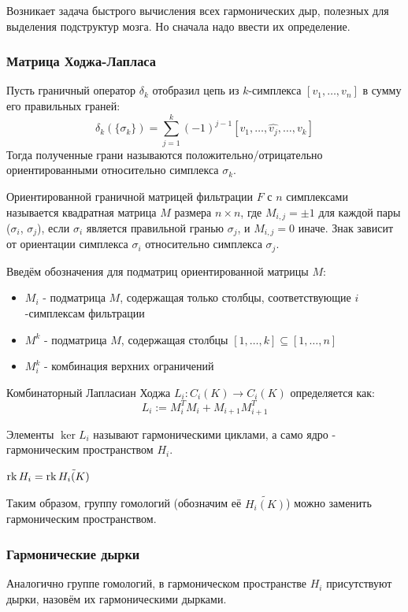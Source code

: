 \documentclass{article}
\begin{document}
Возникает задача быстрого вычисления всех гармонических дыр, полезных для выделения подструктур мозга. Но сначала надо ввести их определение.
\subsubsection{Матрица Ходжа-Лапласа}
\begin{definition}
  Пусть граничный оператор $\delta_k$ отобразил цепь из $k$-симплекса $[v_1,\dots, v_n]$ в сумму его правильных граней:
  \[\delta_k(\{\sigma_k\}) = \sum_{j=1}^k(-1)^{j-1}[v_1,\dots,\hat{v_j},\dots,v_k]\]
  Тогда полученные грани называются положительно/отрицательно ориентированными относительно симплекса $\sigma_k$.
\end{definition}
\begin{definition}
 Ориентированной граничной матрицей фильтрации $F$ с $n$ симплексами называется квадратная матрица $M$ размера $n\times n$, где $M_{i,j}=\pm 1$ для каждой пары ($\sigma_i$, $\sigma_j$), если $\sigma_i$ является правильной гранью $\sigma_j$, и $M_{i,j}=0$ иначе. Знак зависит от ориентации симплекса $\sigma_i$ относительно симплекса $\sigma_j$.
\end{definition}
Введём обозначения для подматриц ориентированной матрицы $M$:
\begin{itemize}
  \item $M_i$ - подматрица $M$, содержащая только столбцы, соответствующие $i$-симплексам фильтрации
  \item $M^k$ - подматрица $M$, содержащая столбцы $[1,\dots, k]\subseteq [1,\dots, n]$
  \item $M_i^k$ - комбинация верхних ограничений
\end{itemize}
\begin{definition}
   Комбинаторный Лапласиан Ходжа $L_i\colon C_i(K) \to C_i(K)$ определяется как:
   \[L_i := M_{i}^TM_i + M_{i+1}M_{i+1}^T\]

   Элементы $\ker L_i$ называют гармоническими циклами, а само ядро - гармоническим пространством $H_i$.
\end{definition}
\begin{lemma}
  $\mathop{\rm rk} H_i = \mathop{\rm rk} \tilde{H_i(K)}$
\end{lemma}
Таким образом, группу гомологий (обозначим её $\tilde{H_i(K)}$) можно заменить гармоническим пространством.

\subsubsection{Гармонические дырки}
\begin{definition}
Аналогично группе гомологий, в гармоническом пространстве $H_i$ присутствуют дырки, назовём их гармоническими дырками.
\end{definition}
\end{document}
